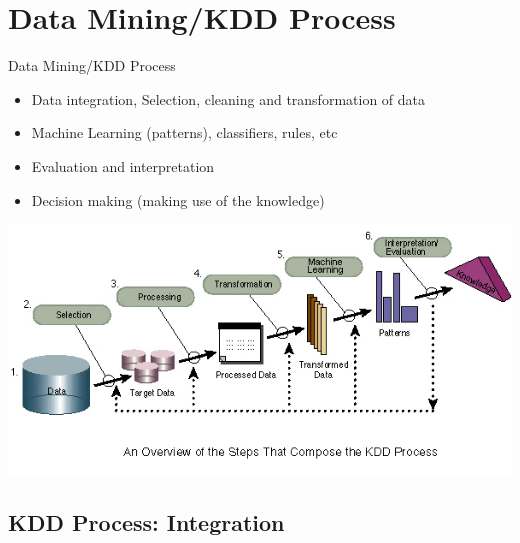 \documentclass{beamer}
\begin{document}

\section{Data Mining/KDD Process}

\begin{frame}{Data Mining/KDD Process}

\begin{itemize}
 \item Data integration, Selection, cleaning and transformation of data
 \item Machine Learning (patterns), classifiers, rules, etc
 \item Evaluation and interpretation
 \item Decision making (making use of the knowledge)
\end{itemize}

\begin{center}
\includegraphics[width=.8\textwidth]{figs/DMProcess}
\end{center}

\end{frame}

\subsection{KDD Process: Integration}
\end{document}

